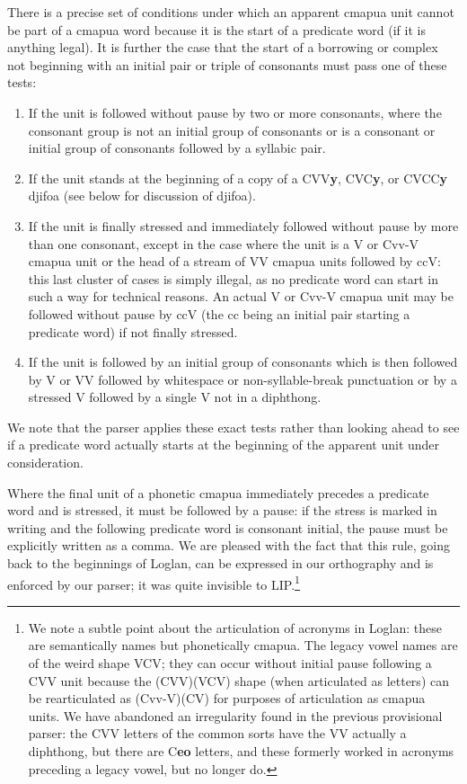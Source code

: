 \documentclass[12pt]{book}
\begin{document}
There is a precise set of conditions under which an apparent cmapua unit cannot be part of a cmapua word because it is the start of a predicate word
(if it is anything legal).  It is further the case that the start of a borrowing or complex not beginning with an initial pair or triple of consonants must pass one of these tests:

\begin{enumerate}

\item  If the unit is followed without pause by two or more consonants, where the consonant group is not an initial group of consonants or is a consonant or initial group of consonants followed by a syllabic pair.

\item  If the unit stands at the beginning of a copy of a CVV{\bf y}, CVC{\bf y}, or CVCC{\bf y} djifoa (see below for discussion of djifoa).

\item  If the unit is finally stressed and immediately followed without pause by more than one consonant, except in the case where the 
unit is a V or Cvv-V cmapua unit or the head of a stream of VV cmapua units followed by ccV:  this last cluster of cases is simply illegal, as no predicate word can start in such a way for technical reasons.  An actual V or Cvv-V cmapua unit may be followed without pause by ccV (the cc being an initial pair starting a predicate word) if not finally stressed. 

\item  If the unit is followed by an initial group of consonants which is then followed by V or VV followed by whitespace or non-syllable-break punctuation
or by a stressed V followed by a single V not in a diphthong.

\end{enumerate}

 We note that the parser applies these exact tests
rather than looking ahead to see if a predicate word actually starts at the beginning of the apparent unit under consideration.

Where the final unit of a phonetic cmapua immediately precedes a predicate word and is stressed, it must be followed by a pause:  if the stress is marked in writing and the following predicate word is consonant initial, the pause must be explicitly written as a comma.  We are pleased with the fact that this rule, going back to the beginnings of Loglan, can be expressed in our orthography and is enforced by our parser;  it was quite invisible to LIP.\footnote{We note a subtle point about the articulation of acronyms in Loglan:  these are semantically names but phonetically cmapua.  The legacy vowel names are of the weird shape VCV;  they can occur without initial pause
following a CVV unit because the (CVV)(VCV) shape (when articulated as letters) can be rearticulated as (Cvv-V)(CV) for purposes of articulation as cmapua units.  We have abandoned an irregularity found in the previous provisional parser:   the CVV letters of the common sorts have the VV actually a diphthong, but there are C{\bf eo} letters, and these formerly worked in acronyms preceding a legacy vowel, but no longer do.}
\end{document}
